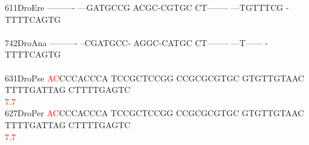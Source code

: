 \documentclass[11pt,twoside,reqno,a4paper]{article}
\begin{document}
{611\hspace*{2\charwidth}DroEre	----------	---GATGCCG	ACGC-CGTGC	CT--------	---TGTTTCG	-TTTTCAGTG	\\
\hspace*{5\charwidth}\hspace*{7\charwidth}\hspace*{1\charwidth}\hspace*{1\charwidth}\hspace*{1\charwidth}\hspace*{1\charwidth}\hspace*{1\charwidth}\hspace*{1\charwidth}\\
742\hspace*{2\charwidth}DroAna	----------	--CGATGCC-	AGGC-CATGC	CT--------	---T------	-TTTTCAGTG	\\
\hspace*{5\charwidth}\hspace*{7\charwidth}\hspace*{1\charwidth}\hspace*{1\charwidth}\hspace*{1\charwidth}\hspace*{1\charwidth}\hspace*{1\charwidth}\hspace*{1\charwidth}\\
631\hspace*{2\charwidth}DroPse	\textcolor{Red}{A}\textcolor{Red}{C}CCCACCCA	TCCGCTCCGG	CCGCGCGTGC	GTGTTGTAAC	TTTTGATTAG	CTTTTGAGTC	\\
\hspace*{5\charwidth}\hspace*{7\charwidth}\hspace*{0\charwidth}\textcolor{Red}{7.7}\hspace*{1\charwidth}\hspace*{1\charwidth}\hspace*{1\charwidth}\hspace*{1\charwidth}\hspace*{1\charwidth}\hspace*{1\charwidth}\\
627\hspace*{2\charwidth}DroPer	\textcolor{Red}{A}\textcolor{Red}{C}CCCACCCA	TCCGCTCCGG	CCGCGCGTGC	GTGTTGTAAC	TTTTGATTAG	CTTTTGAGTC	\\
\hspace*{5\charwidth}\hspace*{7\charwidth}\hspace*{0\charwidth}\textcolor{Red}{7.7}\hspace*{1\charwidth}\hspace*{1\charwidth}\hspace*{1\charwidth}\hspace*{1\charwidth}\hspace*{1\charwidth}\hspace*{1\charwidth}\\
}
\end{document}
